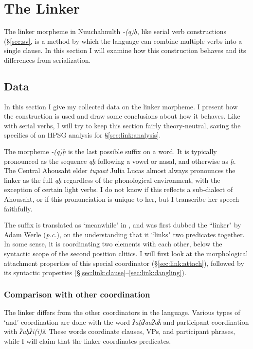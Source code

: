 \chapter{The Linker}
\label{sec:link}

The linker morpheme in Nuuchahnulth \textit{-(q)ḥ}, like serial verb constructions (\S\ref{sec:sv}, is a method by which the language can combine multiple verbs into a single clause. In this section I will examine how this construction behaves and its differences from serialization.

\section{Data} \label{sec:link:data}

In this section I give my collected data on the linker morpheme. I present how the construction is used and draw some conclusions about how it behaves. Like with serial verbs, I will try to keep this section fairly theory-neutral, saving the specifics of an HPSG analysis for \S\ref{sec:link:analysis}.

The morpheme \textit{-(q)ḥ} is the last possible suffix on a word. It is typically pronounced as the sequence \textit{qḥ} following a vowel or nasal, and otherwise as \textit{ḥ}. The Central Ahousaht elder \textit{tupaat} Julia Lucas almost always pronounces the linker as the full \textit{qḥ} regardless of the phonological environment, with the exception of certain light verbs. I do not know if this reflects a sub-dialect of Ahousaht, or if this pronunciation is unique to her, but I transcribe her speech faithfully.

The suffix is translated as `meanwhile' in \cite{sapir1939}, and was first dubbed the ``linker" by Adam Werle (\textit{p.c.}), on the understanding that it ``links" two predicates together. In some sense, it is coordinating two elements with each other, below the syntactic scope of the second position clitics. I will first look at the morphological attachment properties of this special coordinator (\S\ref{sec:link:attach}), followed by its syntactic properties (\S\ref{sec:link:clause}--\ref{sec:link:dangling}).

\subsection{Comparison with other coordination}

The linker differs from the other coordinators in the language. Various types of `and' coordination are done with the word \textit{ʔaḥʔaaʔaƛ} and participant coordination with \textit{ʔuḥʔi(i)š}. These words coordinate clauses, VPs, and participant phrases, while I will claim that the linker coordinates predicates.

